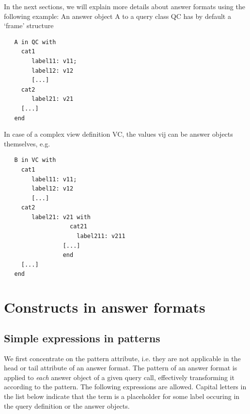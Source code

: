 In the next sections, we will explain more details about answer formats using the following example:
An answer object A to a query class QC has by default a `frame' structure

\begin{verbatim}
   A in QC with
     cat1
        label11: v11;
        label12: v12
        [...]
     cat2
        label21: v21
     [...]
   end
\end{verbatim}

In case of a complex view definition VC, the values vij can be answer objects themselves, e.g.

\begin{verbatim}
   B in VC with
     cat1
        label11: v11;
        label12: v12
        [...]
     cat2
        label21: v21 with
                   cat21
                     label211: v211
                 [...]
                 end
     [...]
   end
\end{verbatim}

\section{Constructs in answer formats}

\subsection{Simple expressions in patterns}

We first concentrate on the pattern attribute, i.e. they are not applicable in the head or tail attribute
of an answer format. The pattern of an answer format is applied to {\em each\/} answer object 
of a given query call, effectively transforming it according to the pattern.
The following expressions are allowed. Capital letters in the list below indicate that the 
term is a placeholder for some label occuring in the query definition or the answer objects. 

